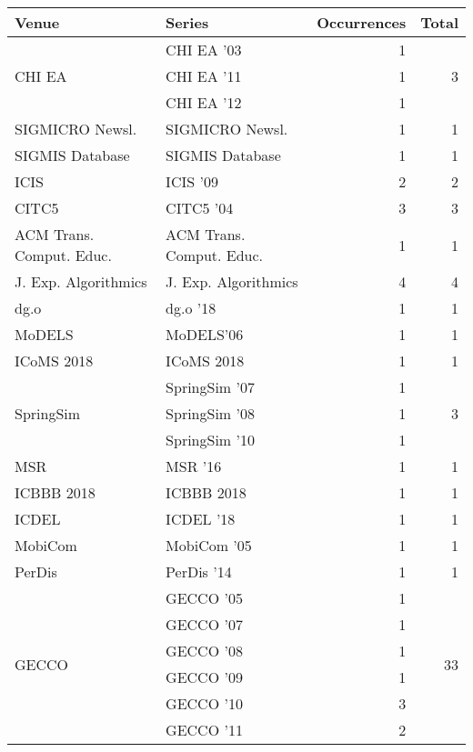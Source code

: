 \begin{table*}[t]
\begin{tabular}{llrr}
Venue & Series & Occurrences & Total\\\hline
\multirow{3}{*}{CHI EA } & CHI EA '03 & 1 & \multirow{3}{*}{3}\\
& CHI EA '11 & 1 &\\
& CHI EA '12 & 1 &\\
\multirow{1}{*}{SIGMICRO Newsl.} & SIGMICRO Newsl. & 1 & \multirow{1}{*}{1}\\
\multirow{1}{*}{SIGMIS Database} & SIGMIS Database & 1 & \multirow{1}{*}{1}\\
\multirow{1}{*}{ICIS } & ICIS '09 & 2 & \multirow{1}{*}{2}\\
\multirow{1}{*}{CITC5 } & CITC5 '04 & 3 & \multirow{1}{*}{3}\\
\multirow{1}{*}{ACM Trans. Comput. Educ.} & ACM Trans. Comput. Educ. & 1 & \multirow{1}{*}{1}\\
\multirow{1}{*}{J. Exp. Algorithmics} & J. Exp. Algorithmics & 4 & \multirow{1}{*}{4}\\
\multirow{1}{*}{dg.o } & dg.o '18 & 1 & \multirow{1}{*}{1}\\
\multirow{1}{*}{MoDELS} & MoDELS'06 & 1 & \multirow{1}{*}{1}\\
\multirow{1}{*}{ICoMS 2018} & ICoMS 2018 & 1 & \multirow{1}{*}{1}\\
\multirow{3}{*}{SpringSim } & SpringSim '07 & 1 & \multirow{3}{*}{3}\\
& SpringSim '08 & 1 &\\
& SpringSim '10 & 1 &\\
\multirow{1}{*}{MSR } & MSR '16 & 1 & \multirow{1}{*}{1}\\
\multirow{1}{*}{ICBBB 2018} & ICBBB 2018 & 1 & \multirow{1}{*}{1}\\
\multirow{1}{*}{ICDEL } & ICDEL '18 & 1 & \multirow{1}{*}{1}\\
\multirow{1}{*}{MobiCom } & MobiCom '05 & 1 & \multirow{1}{*}{1}\\
\multirow{1}{*}{PerDis } & PerDis '14 & 1 & \multirow{1}{*}{1}\\
\multirow{16}{*}{GECCO } & GECCO '05 & 1 & \multirow{16}{*}{33}\\
& GECCO '07 & 1 &\\
& GECCO '08 & 1 &\\
& GECCO '09 & 1 &\\
& GECCO '10 & 3 &\\
& GECCO '11 & 2 &\\

\end{tabular}
\end{table*}
